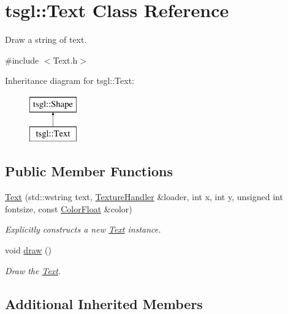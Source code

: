 \hypertarget{classtsgl_1_1_text}{}\section{tsgl\+:\+:Text Class Reference}
\label{classtsgl_1_1_text}


Draw a string of text.  




{\ttfamily \#include $<$Text.\+h$>$}

Inheritance diagram for tsgl\+:\+:Text\+:\begin{figure}[H]
\begin{center}
\leavevmode
\includegraphics[height=2.000000cm]{classtsgl_1_1_text}
\end{center}
\end{figure}
\subsection*{Public Member Functions}
\begin{DoxyCompactItemize}
\item 
\hyperlink{classtsgl_1_1_text_ad1a6a77a4762f4420527457a7a5c24e7}{Text} (std\+::wstring text, \hyperlink{classtsgl_1_1_texture_handler}{Texture\+Handler} \&loader, int x, int y, unsigned int fontsize, const \hyperlink{structtsgl_1_1_color_float}{Color\+Float} \&color)
\begin{DoxyCompactList}\small\item\em Explicitly constructs a new \hyperlink{classtsgl_1_1_text}{Text} instance. \end{DoxyCompactList}\item 
void \hyperlink{classtsgl_1_1_text_a9dc47e4af682abfdab74e37b71f9fbde}{draw} ()
\begin{DoxyCompactList}\small\item\em Draw the \hyperlink{classtsgl_1_1_text}{Text}. \end{DoxyCompactList}\end{DoxyCompactItemize}
\subsection*{Additional Inherited Members}


